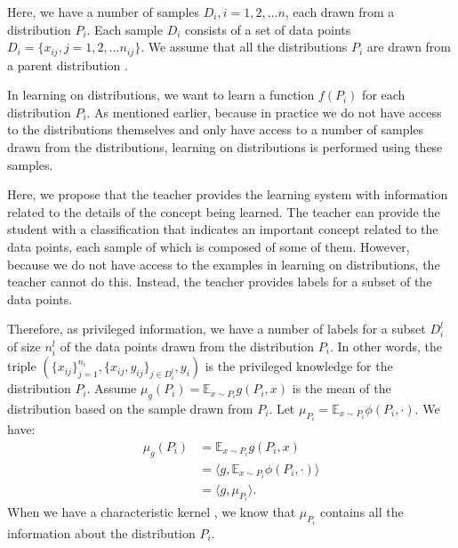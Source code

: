 	Here, we have a number of samples $D_i, i = 1, 2, \ldots n$, each drawn from a distribution $P_i$. Each sample $D_i$ consists of a set of data points $D_i = \{x_{ij}, j = 1, 2, \ldots n_{ij}\}$. We assume that all the distributions $P_i$ are drawn from a parent distribution \cite{muandet2012domain}.
	
	In learning on distributions, we want to learn a function $f(P_i)$ for each distribution $P_i$. As mentioned earlier, because in practice we do not have access to the distributions themselves and only have access to a number of samples drawn from the distributions, learning on distributions is performed using these samples.
	
	Here, we propose that the teacher provides the learning system with information related to the details of the concept being learned. The teacher can provide the student with a classification that indicates an important concept related to the data points, each sample of which is composed of some of them. However, because we do not have access to the examples in learning on distributions, the teacher cannot do this. Instead, the teacher provides labels for a subset of the data points.
	
	Therefore, as privileged information, we have a number of labels for a subset $D_i^l$ of size $n_i^l$ of the data points drawn from the distribution $P_i$. In other words, the triple $(\{x_{ij}\}_{j=1}^{n_i}, \{x_{ij}, y_{ij}\}_{j \in D_i^l}, y_i)$ is the privileged knowledge for the distribution $P_i$. Assume $\mu_g(P_i) = \mathbb{E}_{x \sim P_i} g(P_i, x)$ is the mean of the distribution based on the sample drawn from $P_i$. Let $\mu_{P_i} = \mathbb{E}_{x \sim P_i} \phi(P_i, \cdot)$. We have:
	\begin{align}
		\mu_g(P_i) &= \mathbb{E}_{x \sim P_i} g(P_i, x) \\
		&= \langle g, \mathbb{E}_{x \sim P_i} \phi(P_i, \cdot) \rangle \\
		&= \langle g, \mu_{P_i} \rangle.
	\end{align}
	When we have a characteristic kernel \cite{smola2007hilbert}, we know that $\mu_{P_i}$ contains all the information about the distribution $P_i$.
	
